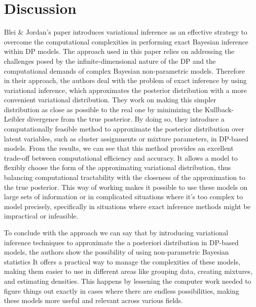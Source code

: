 \documentclass{article}
\begin{document}
\section{Discussion}

Blei \& Jordan's paper introduces variational inference as an effective strategy to overcome the computational complexities in performing exact Bayesian inference within DP models. The approach used in this paper relies on addressing the challenges posed by the infinite-dimensional nature of the DP and the computational demands of complex Bayesian non-parametric models. Therefore in their approach, the authors deal with the problem of exact inference by using variational inference, which approximates the posterior distribution with a more convenient variational distribution. They work on making this simpler distribution as close as possible to the real one by minimizing the Kullback-Leibler divergence from the true posterior. By doing so, they introduce a computationally feasible method to approximate the posterior distribution over latent variables, such as cluster assignments or mixture parameters, in DP-based models. From the results, we can see that this method provides an excellent trade-off between computational efficiency and accuracy. It allows a model to flexibly choose the form of the approximating variational distribution, thus balancing computational tractability with the closeness of the approximation to the true posterior. This way of working makes it possible to use these models on large sets of information or in complicated situations where it's too complex to model precisely, specifically in situations where exact inference methods might be impractical or infeasible.

To conclude with the approach we can say that by introducing variational inference techniques to approximate the a posteriori distribution in DP-based models, the authors show the possibility of using non-parametric Bayesian statistics It offers a practical way to manage the complexities of these models, making them easier to use in different areas like grouping data, creating mixtures, and estimating densities. This happens by lessening the computer work needed to figure things out exactly in cases where there are endless possibilities, making these models more useful and relevant across various fields.
\end{document}
